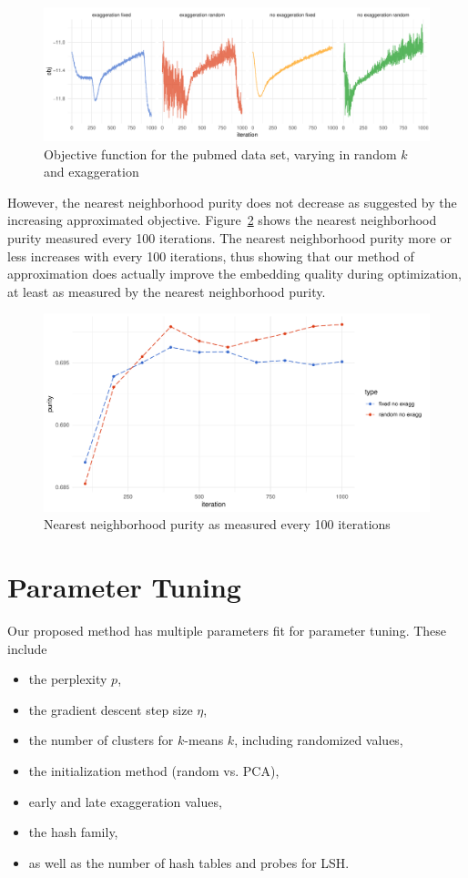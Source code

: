 \begin{figure}[tb]
  \centering
  \includegraphics[width=\linewidth]{img/obj_comp}
  \caption{Objective function for the pubmed data set, varying in random $k$ and exaggeration}
  \label{fig:obj-comp}
\end{figure}

However, the nearest neighborhood purity does not decrease as suggested by the increasing
approximated objective. Figure~\ref{fig:purity-comp} shows the nearest neighborhood
purity measured every 100 iterations. The nearest neighborhood purity more or less
increases with every 100 iterations, thus showing that our method of approximation
does actually improve the embedding quality during optimization, at least as measured
by the nearest neighborhood purity.

\begin{figure}[tb]
  \centering
  \includegraphics[width=.7\linewidth]{img/purity_it}
  \caption{Nearest neighborhood purity as measured every 100 iterations}
  \label{fig:purity-comp}
\end{figure}

\section{Parameter Tuning}

Our proposed method has multiple parameters fit for parameter tuning. These include

\begin{itemize}
  \item the perplexity $p$,
  \item the gradient descent step size $\eta$,
  \item the number of clusters for $k$-means $k$, including randomized values,
  \item the initialization method (random vs. PCA),
  \item early and late exaggeration values,
  \item the hash family,
  \item as well as the number of hash tables and probes for LSH.
\end{itemize}

